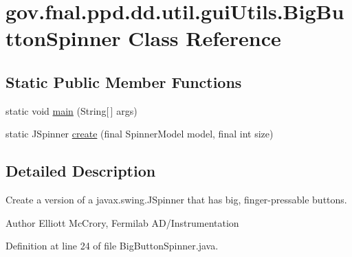 \hypertarget{classgov_1_1fnal_1_1ppd_1_1dd_1_1util_1_1guiUtils_1_1BigButtonSpinner}{\section{gov.\-fnal.\-ppd.\-dd.\-util.\-gui\-Utils.\-Big\-Button\-Spinner Class Reference}
\label{classgov_1_1fnal_1_1ppd_1_1dd_1_1util_1_1guiUtils_1_1BigButtonSpinner}
}
\subsection*{Static Public Member Functions}
\begin{DoxyCompactItemize}
\item 
static void \hyperlink{classgov_1_1fnal_1_1ppd_1_1dd_1_1util_1_1guiUtils_1_1BigButtonSpinner_aeadaef752842508587c3591191772b4c}{main} (String\mbox{[}$\,$\mbox{]} args)
\item 
static J\-Spinner \hyperlink{classgov_1_1fnal_1_1ppd_1_1dd_1_1util_1_1guiUtils_1_1BigButtonSpinner_a7445f7ddf331e4ccfd63df927fef8a34}{create} (final Spinner\-Model model, final int size)
\end{DoxyCompactItemize}


\subsection{Detailed Description}
Create a version of a javax.\-swing.\-J\-Spinner that has big, finger-\/pressable buttons.

\begin{DoxyAuthor}{Author}
Elliott Mc\-Crory, Fermilab A\-D/\-Instrumentation 
\end{DoxyAuthor}


Definition at line 24 of file Big\-Button\-Spinner.\-java.



